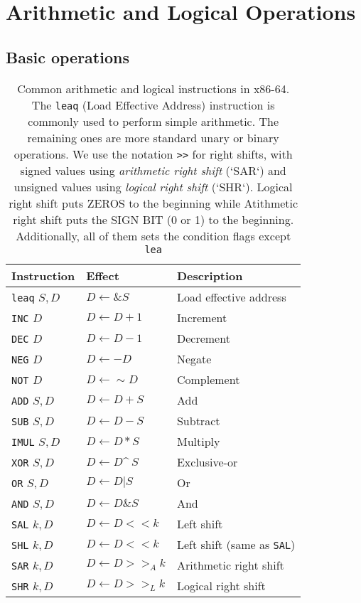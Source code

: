 \documentclass{article}
\begin{document}
\section{Arithmetic and Logical Operations}
\subsection{Basic operations}
\begin{table}[h]
    \centering
    \small
    \renewcommand{\arraystretch}{1.2}
    \begin{tabular}{l l l}
        \toprule
        \textbf{Instruction} & \textbf{Effect} & \textbf{Description} \\
        \midrule
        \texttt{leaq} $S, D$  & $D \leftarrow \&S$ & Load effective address \\
        \midrule
        \texttt{INC} $D$  & $D \leftarrow D+1$ & Increment \\
        \texttt{DEC} $D$  & $D \leftarrow D-1$ & Decrement \\
        \texttt{NEG} $D$  & $D \leftarrow -D$ & Negate \\
        \texttt{NOT} $D$  & $D \leftarrow \sim D$ & Complement \\
        \midrule
        \texttt{ADD} $S, D$  & $D \leftarrow D + S$ & Add \\
        \texttt{SUB} $S, D$  & $D \leftarrow D - S$ & Subtract \\
        \texttt{IMUL} $S, D$  & $D \leftarrow D * S$ & Multiply \\
        \texttt{XOR} $S, D$  & $D \leftarrow D  \^\ S$ & Exclusive-or \\
        \texttt{OR} $S, D$  & $D \leftarrow D | S$ & Or \\
        \texttt{AND} $S, D$  & $D \leftarrow D \& S$ & And \\
        \midrule
        \texttt{SAL} $k, D$  & $D \leftarrow D << k$ & Left shift \\
        \texttt{SHL} $k, D$  & $D \leftarrow D << k$ & Left shift (same as \texttt{SAL}) \\
        \texttt{SAR} $k, D$  & $D \leftarrow D >>_A k$ & Arithmetic right shift \\
        \texttt{SHR} $k, D$  & $D \leftarrow D >>_L k$ & Logical right shift \\
        \bottomrule
    \end{tabular}
    \caption{Common arithmetic and logical instructions in x86-64. The \texttt{leaq} (Load Effective Address) instruction is commonly used to perform simple arithmetic. The remaining ones are more standard unary or binary operations. We use the notation \texttt{>>} for right shifts, with signed values using \textit{arithmetic right shift} (`SAR`) and unsigned values using \textit{logical right shift} (`SHR`). Logical right shift puts ZEROS to the beginning while Atithmetic right shift puts the SIGN BIT (0 or 1) to the beginning. Additionally, all of them sets the condition flags except \texttt{lea}
}
\label{basic-arith}
\end{table}
\end{document}
